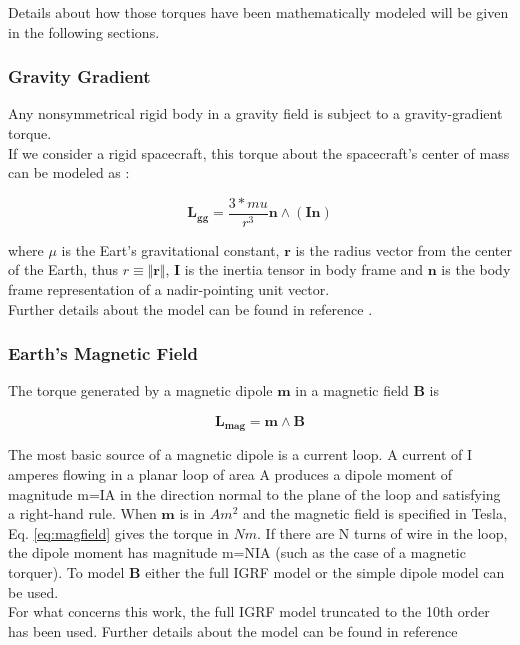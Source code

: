 \documentclass[11pt,a4paper]{report}
\begin{document}
Details about how those torques have been mathematically modeled will be given in the following sections.

\subsubsection{Gravity Gradient}
Any nonsymmetrical rigid body in a gravity field is subject to a gravity-gradient torque.\\
If we consider a rigid spacecraft, this torque about the spacecraft's center of mass can be modeled as :

\begin{equation}
 \mathbf{L_{gg}} = \frac{3*mu}{r^3} \mathbf{n} \wedge (\mathbf{I} \mathbf{n})
\end{equation}

where $\mu$ is the Eart's gravitational constant, $\textbf{r}$ is the radius vector from the center of the Earth, thus $r \equiv \Vert{\textbf{r}}\Vert$, $\textbf{I}$ is the inertia tensor in body frame and $\textbf{n}$ is the body frame representation of a nadir-pointing unit vector.\\
Further details about the model can be found in reference \cite{Ref:Books:Fundamentals}.

\subsubsection{Earth's Magnetic Field}
The torque generated by a magnetic dipole $\textbf{m}$ in a magnetic field $\textbf{B}$ is

\begin{equation}
 \mathbf{L_{mag}} = \mathbf{m} \wedge \mathbf{B}
 \label{eq:magfield}
\end{equation}

The most basic source of a magnetic dipole is a current loop. A current of I amperes flowing in a planar loop of area A produces a dipole moment of magnitude m=IA in the direction normal to the plane of the loop and satisfying a right-hand rule.
When $\textbf{m}$ is in $Am^2$ and the magnetic field is specified in Tesla, Eq. \ref{eq:magfield} gives the torque in $Nm$. If there are N turns of wire in the loop, the dipole moment has magnitude m=NIA (such as the case of a magnetic torquer).
To model $\textbf{B}$ either the full IGRF model or the simple dipole model can be used.\\
For what concerns this work, the full IGRF model truncated to the 10th order has been used. Further details about the model can be found in reference \cite{Ref:Articles:IGRF}
\end{document}
